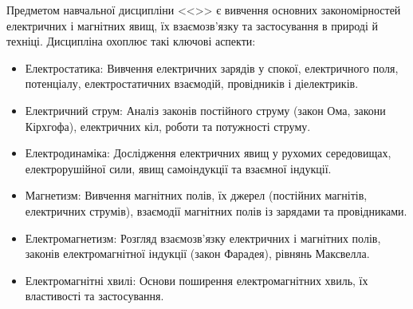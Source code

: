 \documentclass{Syllabus}
\begin{document}
%

Предметом навчальної дисципліни <<\discipline>> є вивчення основних закономірностей електричних і магнітних явищ, їх взаємозв’язку та застосування в природі й техніці. Дисципліна охоплює такі ключові аспекти:

\begin{itemize}
\item Електростатика: Вивчення електричних зарядів у спокої, електричного поля, потенціалу, електростатичних взаємодій, провідників і діелектриків.
\item Електричний струм: Аналіз законів постійного струму (закон Ома, закони Кірхгофа), електричних кіл, роботи та потужності струму.
\item Електродинаміка: Дослідження електричних явищ у рухомих середовищах, електрорушійної сили, явищ самоіндукції та взаємної індукції.
\item Магнетизм: Вивчення магнітних полів, їх джерел (постійних магнітів, електричних струмів), взаємодії магнітних полів із зарядами та провідниками.
\item Електромагнетизм: Розгляд взаємозв’язку електричних і магнітних полів, законів електромагнітної індукції (закон Фарадея), рівнянь Максвелла.
\item Електромагнітні хвилі: Основи поширення електромагнітних хвиль, їх властивості та застосування.
\end{itemize}
\end{document}
